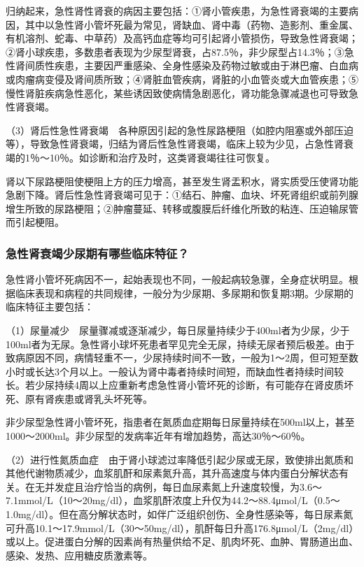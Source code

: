 归纳起来，急性肾性肾衰的病因主要包括：①肾小管疾患，为急性肾衰竭的主要病因，其中以急性肾小管坏死最为常见，肾缺血、肾中毒（药物、造影剂、重金属、有机溶剂、蛇毒、中草药）及高钙血症等均可引起肾小管损伤，导致急性肾衰竭；②肾小球疾患，多数患者表现为少尿型肾衰，占87.5％，非少尿型占14.3％；③急性肾间质性疾患，主要因严重感染、全身性感染及药物过敏或由于淋巴瘤、白血病或肉瘤病变侵及肾间质所致；④肾脏血管疾病，肾脏的小血管炎或大血管疾患；⑤慢性肾脏疾病急性恶化，某些诱因致使病情急剧恶化，肾功能急骤减退也可导致急性肾衰竭。

（3）肾后性急性肾衰竭　各种原因引起的急性尿路梗阻（如腔内阻塞或外部压迫等），导致急性肾衰竭，归结为肾后性急性肾衰竭，临床上较为少见，占急性肾衰竭的1％～10％。如诊断和治疗及时，这类肾衰竭往往可恢复。

肾以下尿路梗阻使梗阻上方的压力增高，甚至发生肾盂积水，肾实质受压使肾功能急剧下降。肾后性急性肾衰竭可见于：①结石、肿瘤、血块、坏死肾组织或前列腺增生所致的尿路梗阻；②肿瘤蔓延、转移或腹膜后纤维化所致的粘连、压迫输尿管而引起梗阻。

\subsubsection{急性肾衰竭少尿期有哪些临床特征？}

急性肾小管坏死病因不一，起始表现也不同，一般起病较急骤，全身症状明显。根据临床表现和病程的共同规律，一般分为少尿期、多尿期和恢复期3期。少尿期的临床特征主要包括：

（1）尿量减少　尿量骤减或逐渐减少，每日尿量持续少于400ml者为少尿，少于100ml者为无尿。急性肾小球坏死患者罕见完全无尿，持续无尿者预后极差。由于致病原因不同，病情轻重不一，少尿持续时间不一致，一般为1～2周，但可短至数小时或长达3个月以上。一般认为肾中毒者持续时间短，而缺血性者持续时间较长。若少尿持续4周以上应重新考虑急性肾小管坏死的诊断，有可能存在肾皮质坏死、原有肾疾患或肾乳头坏死等。

非少尿型急性肾小管坏死，指患者在氮质血症期每日尿量持续在500ml以上，甚至1000～2000ml。非少尿型的发病率近年有增加趋势，高达30％～60％。

（2）进行性氮质血症　由于肾小球滤过率降低引起少尿或无尿，致使排出氮质和其他代谢物质减少，血浆肌酐和尿素氮升高，其升高速度与体内蛋白分解状态有关。在无并发症且治疗恰当的病例，每日血尿素氮上升速度较慢，为3.6～7.1mmol/L（10～20mg/dl），血浆肌酐浓度上升仅为44.2～88.4μmol/L（0.5～1.0mg/dl）。但在高分解状态时，如伴广泛组织创伤、全身性感染等，每日尿素氮可升高10.1～17.9mmol/L（30～50mg/dl），肌酐每日升高176.8μmol/L（2mg/dl）或以上。促进蛋白分解的因素尚有热量供给不足、肌肉坏死、血肿、胃肠道出血、感染、发热、应用糖皮质激素等。

